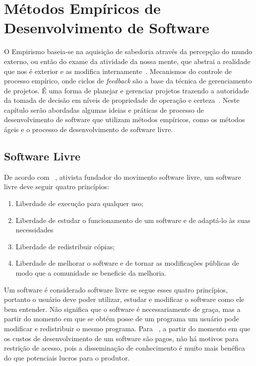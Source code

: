 \chapter{Métodos Empíricos de Desenvolvimento de Software}
\label{cap:desenvolvimento-empirico}

O Empirismo baseia-se na aquisição de sabedoria através da percepção do mundo 
externo, ou então do exame da atividade da nossa mente, que abstrai a realidade 
que nos é exterior e as modifica internamente~\cite{chaui2003}.
%
Mecanismos do controle de processo empírico, onde ciclos de \emph{feedback} são a base da técnica de gerenciamento de projetos.
%
É uma forma de planejar e gerenciar projetos trazendo a autoridade da tomada de decisão em níveis de propriedade de operação e certeza~\cite{Schwaber2004}.
%
Neste capítulo serão abordadas algumas ideias e práticas de processo de desenvolvimento
de software que utilizam métodos empíricos, como os métodos ágeis e o processo
de desenvolvimento de software livre.
%
\section{Software Livre}


%
De acordo com ~, ativista fundador do movimento software livre, um software livre deve seguir quatro princípios:
%
\begin{enumerate}
\item Liberdade de execução para qualquer uso;
\item Liberdade de estudar o funcionamento de um software e de adaptá-lo às suas 
necessidades
\item Liberdade de redistribuir cópias;
\item Liberdade de melhorar o software e de tornar as modificações públicas de modo 
que a comunidade se beneficie da melhoria.
\end{enumerate}
%
Um software é considerado software livre se segue esses quatro princípios, portanto 
o usuário deve poder utilizar, estudar e modificar o software como ele bem entender. Não significa que o software é necessariamente de graça, mas a partir do momento em 
que se obtém posse de um programa um usuário pode modificar e redistribuir o mesmo 
programa.
%
Para ~, a partir do momento em que os custos de desenvolvimento de um software são pagos, não há motivos para restrição de acesso, pois a disseminação de conhecimento é muito mais benéfica do que potenciais lucros para o produtor.

